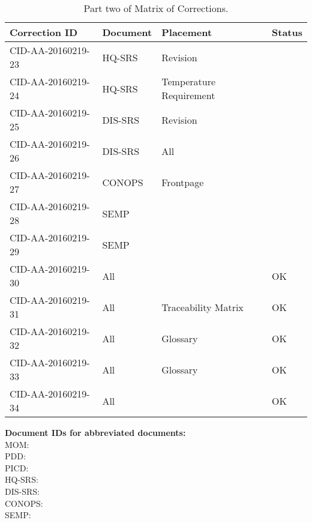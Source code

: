 \begin{table}[ht]
\centering
\begin{tabular}{|>{\centering\arraybackslash}p{4.5cm}|>{\centering\arraybackslash}p{2cm}|>{\centering\arraybackslash}p{3cm}|>{\centering\arraybackslash}p{3cm}|}
\hline \textbf{Correction ID} & \textbf{Document} & \textbf{Placement} & \textbf{Status} \\ 
\hline CID-AA-20160219-23 & HQ-SRS & Revision & \\ 
\hline CID-AA-20160219-24 & HQ-SRS & Temperature Requirement & \\ 
\hline CID-AA-20160219-25 & DIS-SRS & Revision & \\ 
\hline CID-AA-20160219-26 & DIS-SRS & All & \\ 
\hline CID-AA-20160219-27 & CONOPS & Frontpage & \\ 
\hline CID-AA-20160219-28 & SEMP &  & \\ 
\hline CID-AA-20160219-29 & SEMP &  & \\ 
\hline CID-AA-20160219-30 & All &  & OK\\ 
\hline CID-AA-20160219-31 & All & Traceability Matrix & OK\\ 
\hline CID-AA-20160219-32 & All & Glossary & OK\\ 
\hline CID-AA-20160219-33 & All & Glossary & OK\\ 
\hline CID-AA-20160219-34 & All &  & OK\\
\hline 
\end{tabular}
\caption{Part two of Matrix of Corrections.}
\label{tb:MoC2} 
\end{table}

\vspace{20pt}
\noindent \textbf{Document IDs for abbreviated documents:}\\
MOM:        \mom \\
PDD:        \pdd \\
PICD:       \picd \\
HQ-SRS:     \srshq \\
DIS-SRS:    \srsdis \\
CONOPS:     \conops \\
SEMP:       \semp \\

